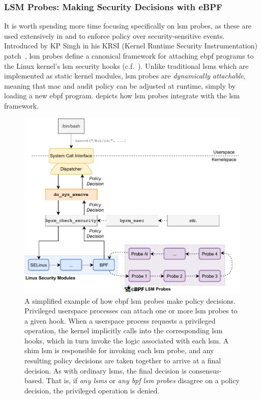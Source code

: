 \subsubsection*{LSM Probes: Making Security Decisions with eBPF}

It is worth spending more time focusing specifically on \gls{lsm} probes, as these are used
extensively in \bpfbox{} and \bpfcontain{} to enforce policy over security-sensitive
events. Introduced by KP Singh in his KRSI (Kernel Runtime Security Instrumentation)
patch~\cite{singh2019_krsi}, \gls{lsm} probes define a canonical framework for attaching \gls{ebpf}
programs to the Linux kernel's \gls{lsm} security hooks (c.f.~). Unlike
traditional \gls{lsm}s which are implemented as static kernel modules, \gls{lsm} probes are
\textit{dynamically attachable}, meaning that \gls{mac} and audit policy can be adjusted at
runtime, simply by loading a new \gls{ebpf} program.   depicts how \gls{lsm} probes
integrate with the \gls{lsm} framework.

\begin{figure}[tbp]
  \centering
  \includegraphics[width=0.8\linewidth]{figs/background/bpf-lsm.pdf}
  \caption[How eBPF LSM probes make policy decisions]{A simplified example of how \gls{ebpf} \gls{lsm} probes make policy decisions. Privileged userspace processes can attach one or more \gls{lsm} probes to a given hook. When a userspace process requests a privileged operation, the kernel implicitly calls into the corresponding \gls{lsm} hooks, which in turn invoke the logic associated with each \gls{lsm}. A shim \gls{lsm} is responsible for invoking each \gls{lsm} probe, and any resulting policy decisions are taken together to arrive at a final decision. As with ordinary \gls{lsm}s, the final decision is consensus-based. That is, if \textit{any \gls{lsm}s} or \textit{any \gls{bpf} \gls{lsm} probes} disagree on a policy decision, the privileged operation is denied.}%
  \label{fig:bpf-lsm}
\end{figure}

